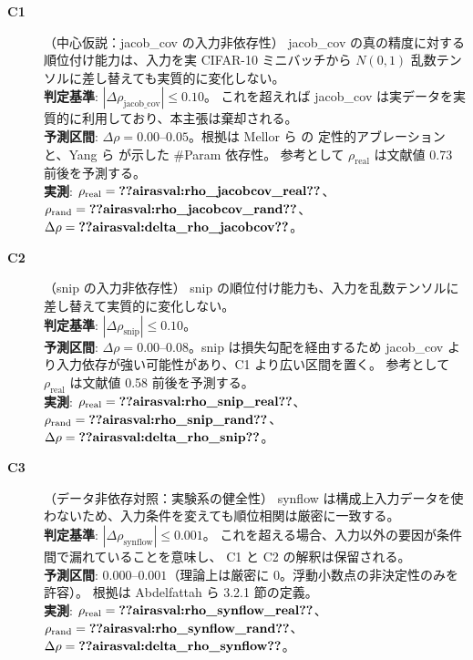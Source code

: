 \documentclass[11pt]{article}
\providecommand{\airasval}[1]{\textbf{??airasval:\detokenize{#1}??}}
\providecommand{\unverified}[1]{#1}
\begin{document}
\begin{description}

\item[\textbf{C1}]（中心仮説：jacob\_cov の入力非依存性）
jacob\_cov の真の精度に対する順位付け能力は、入力を実 CIFAR-10 ミニバッチから
$N(0,1)$ 乱数テンソルに差し替えても実質的に変化しない。\\
\textbf{判定基準}: $|\Delta\rho_{\mathrm{jacob\_cov}}| \le 0.10$。
これを超えれば jacob\_cov は実データを実質的に利用しており、本主張は棄却される。\\
\textbf{予測区間}: $\Delta\rho = 0.00$--$0.05$。根拠は Mellor ら \cite{mellor2021naswot} の
定性的アブレーションと、Yang ら \cite{yang2023revisiting} が示した \#Param 依存性。
参考として $\rho_{\mathrm{real}}$ は文献値 \unverified{0.73} 前後を予測する。\\
\textbf{実測}: $\rho_{\mathrm{real}} = \airasval{rho_jacobcov_real}$、
$\rho_{\mathrm{rand}} = \airasval{rho_jacobcov_rand}$、
$\Delta\rho = \airasval{delta_rho_jacobcov}$。

\item[\textbf{C2}]（snip の入力非依存性）
snip の順位付け能力も、入力を乱数テンソルに差し替えて実質的に変化しない。\\
\textbf{判定基準}: $|\Delta\rho_{\mathrm{snip}}| \le 0.10$。\\
\textbf{予測区間}: $\Delta\rho = 0.00$--$0.08$。snip は損失勾配を経由するため
jacob\_cov より入力依存が強い可能性があり、C1 より広い区間を置く。
参考として $\rho_{\mathrm{real}}$ は文献値 \unverified{0.58} 前後を予測する。\\
\textbf{実測}: $\rho_{\mathrm{real}} = \airasval{rho_snip_real}$、
$\rho_{\mathrm{rand}} = \airasval{rho_snip_rand}$、
$\Delta\rho = \airasval{delta_rho_snip}$。

\item[\textbf{C3}]（データ非依存対照：実験系の健全性）
synflow は構成上入力データを使わないため、入力条件を変えても順位相関は厳密に一致する。\\
\textbf{判定基準}: $|\Delta\rho_{\mathrm{synflow}}| \le 0.001$。
これを超える場合、入力以外の要因が条件間で漏れていることを意味し、
C1 と C2 の解釈は保留される。\\
\textbf{予測区間}: $0.000$--$0.001$（理論上は厳密に $0$。浮動小数点の非決定性のみを許容）。
根拠は Abdelfattah ら \cite{abdelfattah2021zerocost} 3.2.1 節の定義。\\
\textbf{実測}: $\rho_{\mathrm{real}} = \airasval{rho_synflow_real}$、
$\rho_{\mathrm{rand}} = \airasval{rho_synflow_rand}$、
$\Delta\rho = \airasval{delta_rho_synflow}$。


\end{description}
\end{document}

